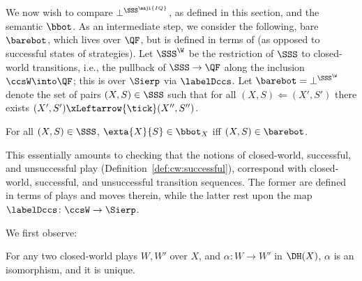 \documentclass{LMCS}
\renewcommand{\QFI}{\maji{IQ}}
\renewcommand{\LLL}{\QFI}
\renewcommand{\SSSL}{\SSS^{\LLL}}
\theoremstyle{plain}\newtheorem{satz}[thm]{Satz}
\begin{document}
We now wish to compare $\bot^{\SSSL}$, as defined in this section, and
the semantic $\bbot$. As an intermediate step, we consider the
following, bare $\barebot$, which lives over $\QF$, but is defined in
terms of \ltss{} (as opposed to successful states of strategies).  Let
$\SSS^\W$ be the restriction of $\SSS$ to closed-world transitions,
i.e., the pullback of $\SSS \to \QF$ along the inclusion $\ccsW \into
\QF$; this is \anlts{} over $\Sierp$ via $\labelDccs$.  Let $\barebot
= \bot^{\SSS^\W}$ denote the set of pairs $(X,S) \in \SSS$ such that
for all $(X,S) \Leftarrow (X',S')$ there exists $(X',S')
\xLeftarrow{\tick} (X'',S'')$.
\begin{lem}\label{lem:bbot:bot}
  For all $(X,S) \in \SSS$,  $\exta{X}{S} \in \bbot_X$ iff $(X,S) \in \barebot$.
\end{lem}

This essentially amounts to checking that the notions of closed-world,
successful, and unsuccessful play
(Definition~\ref{def:cw:successful}), correspond with closed-world,
successful, and unsuccessful transition sequences.  The former are
defined in terms of plays and moves therein, while the latter rest
upon the map $\labelDccs \colon \ccsW \to \Sierp$.

  We first observe:
\begin{lem}\label{lem:closedworld}
  For any two closed-world plays $W,W'$ over $X$, and $\alpha \colon W
  \to W'$ in $\DH(X)$, $\alpha$ is an isomorphism, and it is unique.
\end{lem}
\end{document}
